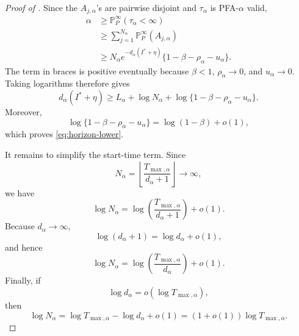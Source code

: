 \documentclass[12pt]{article}
\theoremstyle{spaced}
\theoremstyle{remark}
\newcommand{\calF}{\mathcal F}
\newcommand{\ind}{\mathbbm 1}
\newcommand{\Pinf}[1]{\mathbb P_{#1}^{\infty}}
\newcommand{\Pchg}[3]{\mathbb P_{#1,#2,#3}}
\begin{document}
\begin{proof}[Proof of ]
Since the \(A_{j,\alpha}\)'s are pairwise disjoint and
\(\tau_\alpha\) is PFA-\(\alpha\) valid,
\begin{align*}
    \alpha
    &\ge
    \mathbb P_P^\infty(\tau_\alpha<\infty)\\
    &\ge
    \sum_{j=1}^{N_\alpha}
    \mathbb P_P^\infty(A_{j,\alpha})\\
    &\ge
    N_\alpha
    e^{-d_\alpha(I^*+\eta)}
    \{1-\beta-\rho_\alpha-u_\alpha\}.
\end{align*}
The term in braces is positive eventually because
\(\beta<1\), \(\rho_\alpha\to0\), and \(u_\alpha\to0\).
Taking logarithms therefore gives
\[
    d_\alpha(I^*+\eta)
    \ge
    L_\alpha+\log N_\alpha
    +\log\{1-\beta-\rho_\alpha-u_\alpha\}.
\]
Moreover,
\[
    \log\{1-\beta-\rho_\alpha-u_\alpha\}
    =
    \log(1-\beta)+o(1),
\]
which proves \eqref{eq:horizon-lower}.

It remains to simplify the start-time term. Since
\[
    N_\alpha
    =
    \left\lfloor
        \frac{T_{\max,\alpha}}{d_\alpha+1}
    \right\rfloor
    \longrightarrow\infty,
\]
we have
\[
    \log N_\alpha
    =
    \log\left(
        \frac{T_{\max,\alpha}}{d_\alpha+1}
    \right)
    +o(1).
\]
Because \(d_\alpha\to\infty\),
\[
    \log(d_\alpha+1)=\log d_\alpha+o(1),
\]
and hence
\[
    \log N_\alpha
    =
    \log\left(
        \frac{T_{\max,\alpha}}{d_\alpha}
    \right)
    +o(1).
\]
Finally, if
\[
    \log d_\alpha=o(\log T_{\max,\alpha}),
\]
then
\[
    \log N_\alpha
    =
    \log T_{\max,\alpha}-\log d_\alpha+o(1)
    =
    (1+o(1))\log T_{\max,\alpha}.
\]
\end{proof}

\end{document}
